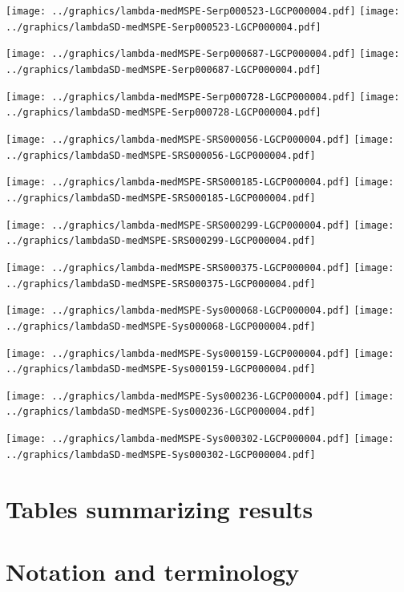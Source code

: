 \documentclass[review]{elsarticle}
\begin{document}
\texttt{[image: ../graphics/lambda-medMSPE-Serp000523-LGCP000004.pdf]}
\texttt{[image: ../graphics/lambdaSD-medMSPE-Serp000523-LGCP000004.pdf]}

\texttt{[image: ../graphics/lambda-medMSPE-Serp000687-LGCP000004.pdf]}
\texttt{[image: ../graphics/lambdaSD-medMSPE-Serp000687-LGCP000004.pdf]}

\texttt{[image: ../graphics/lambda-medMSPE-Serp000728-LGCP000004.pdf]}
\texttt{[image: ../graphics/lambdaSD-medMSPE-Serp000728-LGCP000004.pdf]}

\texttt{[image: ../graphics/lambda-medMSPE-SRS000056-LGCP000004.pdf]}
\texttt{[image: ../graphics/lambdaSD-medMSPE-SRS000056-LGCP000004.pdf]}

\texttt{[image: ../graphics/lambda-medMSPE-SRS000185-LGCP000004.pdf]}
\texttt{[image: ../graphics/lambdaSD-medMSPE-SRS000185-LGCP000004.pdf]}

\texttt{[image: ../graphics/lambda-medMSPE-SRS000299-LGCP000004.pdf]}
\texttt{[image: ../graphics/lambdaSD-medMSPE-SRS000299-LGCP000004.pdf]}

\texttt{[image: ../graphics/lambda-medMSPE-SRS000375-LGCP000004.pdf]}
\texttt{[image: ../graphics/lambdaSD-medMSPE-SRS000375-LGCP000004.pdf]}

\texttt{[image: ../graphics/lambda-medMSPE-Sys000068-LGCP000004.pdf]}
\texttt{[image: ../graphics/lambdaSD-medMSPE-Sys000068-LGCP000004.pdf]}

\texttt{[image: ../graphics/lambda-medMSPE-Sys000159-LGCP000004.pdf]}
\texttt{[image: ../graphics/lambdaSD-medMSPE-Sys000159-LGCP000004.pdf]}

\texttt{[image: ../graphics/lambda-medMSPE-Sys000236-LGCP000004.pdf]}
\texttt{[image: ../graphics/lambdaSD-medMSPE-Sys000236-LGCP000004.pdf]}

\texttt{[image: ../graphics/lambda-medMSPE-Sys000302-LGCP000004.pdf]}
\texttt{[image: ../graphics/lambdaSD-medMSPE-Sys000302-LGCP000004.pdf]}


\section{Tables summarizing results}


\section{Notation and terminology}
\end{document}
